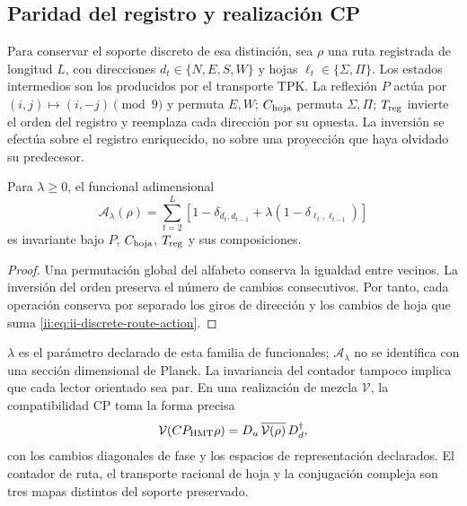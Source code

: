 \subsection{Paridad del registro y realización CP}

Para conservar el soporte discreto de esa distinción, sea \(\rho\) una
ruta registrada de longitud \(L\), con direcciones
\(d_t\in\{N,E,S,W\}\) y hojas \(\ell_t\in\{\Sigma,\Pi\}\).
Los estados intermedios son los producidos por el transporte TPK.
La reflexión \(P\) actúa por \((i,j)\mapsto(i,-j)\pmod9\) y
permuta \(E,W\); \(C_{\rm hoja}\) permuta \(\Sigma,\Pi\);
\(T_{\rm reg}\) invierte el orden del registro y reemplaza cada
dirección por su opuesta. La inversión se efectúa sobre el registro
enriquecido, no sobre una proyección que haya olvidado su predecesor.

\begin{proposition}
Para \(\lambda\ge0\), el funcional adimensional
\begin{equation}
 \mathcal A_\lambda(\rho)=
 \sum_{t=2}^{L}\left[1-\delta_{d_t,d_{t-1}}
             +\lambda(1-\delta_{\ell_t,\ell_{t-1}})\right]
 \label{ii:eq:ii-discrete-route-action}
\end{equation}
es invariante bajo \(P\), \(C_{\rm hoja}\), \(T_{\rm reg}\) y
sus composiciones.
\end{proposition}

\begin{proof}
Una permutación global del alfabeto conserva la igualdad entre vecinos.
La inversión del orden preserva el número de cambios consecutivos.
Por tanto, cada operación conserva por separado los giros de dirección
y los cambios de hoja que suma \eqref{ii:eq:ii-discrete-route-action}.
\end{proof}

\(\lambda\) es el parámetro declarado de esta familia de funcionales;
\(\mathcal A_\lambda\) no se identifica con una sección dimensional de
Planck. La invariancia del contador tampoco implica que cada lector
orientado sea par. En una realización de mezcla \(\mathcal V\), la
compatibilidad CP toma la forma precisa
\begin{equation}
 \mathcal V(CP_{\rm HMT}\rho)
 =D_u\,\overline{\mathcal V(\rho)}\,D_d^\dagger,
 \label{ii:eq:ii-cp-square}
\end{equation}
con los cambios diagonales de fase y los espacios de representación
declarados. El contador de ruta, el transporte racional de hoja y la
conjugación compleja son tres mapas distintos del soporte preservado.

